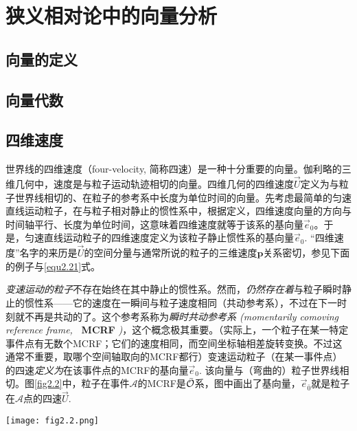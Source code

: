 \chapter{狭义相对论中的向量分析}
\label{chap2}

\section{向量的定义}
\label{sec2.1}

\section{向量代数}
\label{sec2.2}

\section{四维速度}
\label{sec2.3}
世界线的四维速度（four-velocity, 简称四速）是一种十分重要的向量。伽利略的三维几何中，速度是与粒子运动轨迹相切的向量。四维几何的四维速度$\vec{U}$定义为与粒子世界线相切的、在粒子的参考系中长度为单位时间的向量。先考虑最简单的匀速直线运动粒子，在与粒子相对静止的惯性系中，根据定义，四维速度向量的方向与时间轴平行、长度为单位时间，这意味着四维速度就等于该系的基向量$\vec{e}_0$。于是，匀速直线运动粒子的四维速度定义为该粒子静止惯性系的基向量$\vec{e}_0$. “四维速度”名字的来历是$\vec{U}$的空间分量与通常所说的粒子的三维速度$\bm{p}$关系密切，参见下面的例子与\eqref{equ2.21}式。


\textit{变速运动的粒子}不存在始终在其中静止的惯性系。然而，\textit{仍然存在着}与粒子瞬时静止的惯性系——它的速度在一瞬间与粒子速度相同（共动参考系），不过在下一时刻就不再是共动的了。这个参考系称为\textit{瞬时共动参考系 (momentarily comoving reference frame,} \textbf{\ MCRF} \textit{)}，这个概念极其重要。（实际上，一个粒子在某一特定事件点有无数个MCRF；它们的速度相同，而空间坐标轴相差旋转变换。不过这通常不重要，取哪个空间轴取向的MCRF都行）变速运动粒子（在某一事件点）的四速\textit{定义为}在该事件点的MCRF的基向量$\vec{e}_0$. 该向量与（弯曲的）粒子世界线相切。图\ref{fig2.2}中，粒子在事件$\mathscr{A}$的MCRF是$\bar{\mathcal{O}}$系，图中画出了基向量，$\vec{e}_{\bar{0}}$就是粒子在$\mathscr{A}$点的四速$\vec{U}$.

{
    \centering
    \texttt{[image: fig2.2.png]}
    \label{fig2.2}
}


